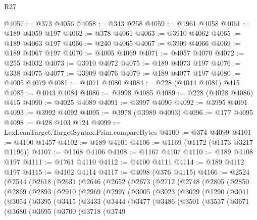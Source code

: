 \begin{lexlean}{R27}
\begin{coremodule}
@4057 := @373 @4056
@4058 := @343 @258
@4059 := @1961 @4058
@4061 := @189 @4059 @197
@4062 := @378 @4061
@4063 := @3910 @4062
@4065 := @189 @4063 @197
@4066 := @240 @4065
@4067 := @3909 @4066
@4069 := @189 @4067 @197
@4070 := @4005 @4069
@4071 := @4057 @4070
@4072 := @255 @4032
@4073 := @3910 @4072
@4075 := @189 @4073 @197
@4076 := @338 @4075
@4077 := @3909 @4076
@4079 := @189 @4077 @197
@4080 := @4005 @4079
@4081 := @4071 @4080
@4084 := @228 (@4044 @4081) @415
@4085 := @4043 @4084
@4086 := @3998 @4085
@4089 := @228 (@4028 @4086) @415
@4090 := @4025 @4089
@4091 := @3997 @4090
@4092 := @3995 @4091
@4093 := @3992 @4092
@4095 := @3978 (@3989 @4093)
@4096 := @177 @4095
@4098 := @428 @103 @124
@4099 := LexLeanTarget.TargetSyntax.Prim.compareBytes
@4100 := @374 @4099
@4101 := @4100 @1457
@4102 := @189 @4101
@4106 := @1169 (@1172 (@1173 @3217 @1196))
@4107 := @1168 @4106
@4108 := @1167 @4107
@4110 := @189 @4108 @197
@4111 := @1761 @4110
@4112 := @4100 @4111
@4114 := @189 @4112 @197
@4115 := @4102 @4114
@4117 := @4098 (@376 @4115)
@4166 := @2524
    (@2544
      (@2618
        (@2631
          (@2646
            (@2652
              (@2673
                (@2712
                  (@2748
                    (@2805
                      (@2850
                        (@2869
                          (@2893
                            (@2910
                              (@2969
                                (@2997
                                  (@3005
                                    (@3023
                                      (@3029
                                        (@1290
                                          (@3041
                                            (@3054
                                              (@3395
                                                (@3415
                                                  (@3433
                                                    (@3444
                                                      (@3477
                                                        (@3486
                                                          (@3501
                                                            (@3537
                                                              (@3671
                                                                (@3680
                                                                  (@3695
                                                                    (@3700
                                                                      (@3718
                                                                        (@3749

\end{coremodule}
\end{lexlean}
